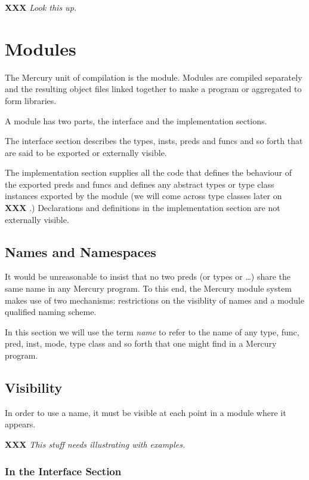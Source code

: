 \documentclass[a4paper,11pt,notitlepage,onecolumn]{article}
\newcommand{\XXX}[1]%
{{\small\textbf{XXX} \emph{#1}}}
\begin{document}
\XXX{Look this up.}



\section{Modules}

The Mercury unit of compilation is the module.  Modules
are compiled separately and the resulting object files linked
together to make a program or aggregated to form libraries.

A module has two parts, the interface and the implementation sections.

The interface section describes the types, insts, preds and funcs and so
forth that are said to be exported or externally visible.

The implementation section supplies all the code that defines the
behaviour of the exported preds and funcs and defines any abstract
types or type class instances exported by the module (we will come
across type classes later on \XXX{}.)  Declarations and definitions in
the implementation section are not externally visible.

\subsection{Names and Namespaces}

It would be unreasonable to insist that no two preds (or types
or \ldots) share the same name in any Mercury program.  To this
end, the Mercury module system makes use of two mechanisms:
restrictions on the visiblity of names and a module qualified
naming scheme.

In this section we will use the term \emph{name} to refer to the
name of any type, func, pred, inst, mode, type class and so
forth that one might find in a Mercury program.

\subsection{Visibility}

In order to use a name, it must be visible at each point in
a module where it appears.

\XXX{This stuff needs illustrating with examples.}

\subsubsection{In the Interface Section}
\end{document}
